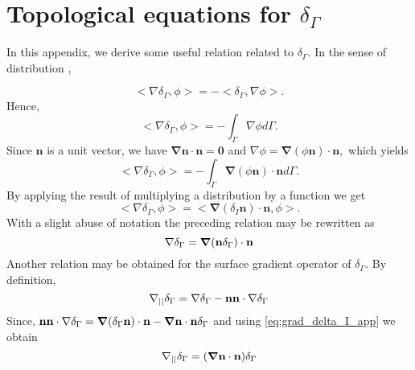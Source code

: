 \section{Topological equations for $\delta_\Gamma$}
\label{ap:delta_I}
In this appendix, we derive some useful relation related to $\delta_\Gamma$. In the sense of distribution \citep{appel2007}, 

\begin{equation}
<\nabla \delta_\Gamma,\phi> = - <\delta_\Gamma,\nabla \phi>.
\end{equation}
Hence,
\begin{equation}
<\nabla \delta_\Gamma,\phi> = - \int_{\Gamma} \nabla \phi d\Gamma.
\label{eq:1grad_delta_I}
\end{equation}
Since $\textbf{n}$ is a unit vector, we have $\bm\nabla \textbf{n} \cdot \textbf{n} =\bm 0$ and%
$\nabla \phi= \bm\nabla (\phi \textbf{n}) \cdot \textbf{n},$
which yields 
\begin{equation}
<\nabla \delta_\Gamma,\phi> = - \int_{\Gamma} \bm\nabla (\phi \textbf{n}) \cdot \textbf{n} d\Gamma. 
\end{equation}
By applying the result of multiplying a distribution by a function we get \citep{appel2007} %
\begin{equation}
<\nabla \delta_\Gamma,\phi> = <\bm\nabla (\delta _I \textbf{n}) \cdot \textbf{n},\phi>.
\end{equation}
With a slight abuse of notation the preceding relation may be rewritten as
\begin{equation}
    \mathbf{\nabla}\delta_\Gamma 
    =   \bm\nabla (\textbf{n} \delta_\Gamma) \cdot \textbf{n}
    \label{eq:grad_delta_I_app}
\end{equation}
Another relation may be obtained for the surface gradient operator of $\delta_\Gamma$. By definition,
\begin{equation}
  \mathbf{\nabla}_{||} \delta_\Gamma  = \mathbf{\nabla}\delta_\Gamma - \textbf{nn}\cdot\mathbf{\nabla}\delta_\Gamma
\end{equation}
Since, $\textbf{nn}\cdot\mathbf{\nabla}\delta_\Gamma = \bm{\mathbf{\nabla}} (\delta_\Gamma\textbf{n})\cdot \textbf{n}-\bm{\mathbf{\nabla}}\textbf{n}\cdot \textbf{n} \delta_\Gamma$ and using \ref{eq:grad_delta_I_app} we obtain
\begin{equation}
  \mathbf{\nabla}_{||} \delta_\Gamma  = (\bm{\mathbf{\nabla}}\textbf{n}\cdot \textbf{n}) \delta_\Gamma
\label{eq:gradI_deltaI}
\end{equation}


